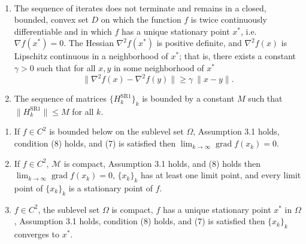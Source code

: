 \begin{assumption}\label{RiemannianAssumptionsGlobalConvergence} \ \\[-1.5\baselineskip]
    \begin{enumerate}
        \item The sequence of iterates does not terminate and remains in a closed, bounded, convex set $D$ on which the function $f$ is twice continuously differentiable and in which $f$ has a unique stationary point $x^*$, i.e. $\nabla f(x^*) = 0$. The Hessian $\nabla^2 f(x^*)$ is positive definite, and $\nabla^2 f(x)$ is Lipschitz continuous in a neighborhood of $x^*$; that is, there exists a constant $\gamma > 0$ such that for all $x, y$ in some neighborhood of $x^*$ \begin{equation*} \lVert \nabla^2 f(x) - \nabla^2 f(y) \rVert \geq \gamma \ \lVert x - y \rVert. \end{equation*}
        \item The sequence of matrices $\{ H^{\mathrm{SR1}}_k \}_k$ is bounded by a constant $M$ such that $\lVert H^{\mathrm{SR1}}_k \rVert \leq M$ for all $k$.
    \end{enumerate}
\end{assumption}

\begin{theorem} \label{RiemannianGlobalConvergence}
    \begin{enumerate}
        \item If $f \in C^2$ is bounded below on the sublevel set $\Omega$, Assumption 3.1 holds, condition (8) holds, and (7) is satisfied then $\lim_{k \rightarrow \infty} \operatorname{grad} f(x_k) = 0$.
        \item If $f \in C^2$, $\mathcal{M}$ is compact, Assumption 3.1 holds, and (8) holds then $\lim_{k \rightarrow \infty} \operatorname{grad} f(x_k) = 0$, $\{ x_k \}_k$ has at least one limit point, and every limit point of $\{ x_k \}_k$ is a stationary point of $f$.
        \item $f \in C^2$, the sublevel set $\Omega$ is compact, $f$ has a unique stationary point $x^*$ in $\Omega$, Assumption 3.1 holds, condition (8) holds, and (7) is satisfied then $\{ x_k \}_k$ converges to $x^*$.
    \end{enumerate}
\end{theorem}

